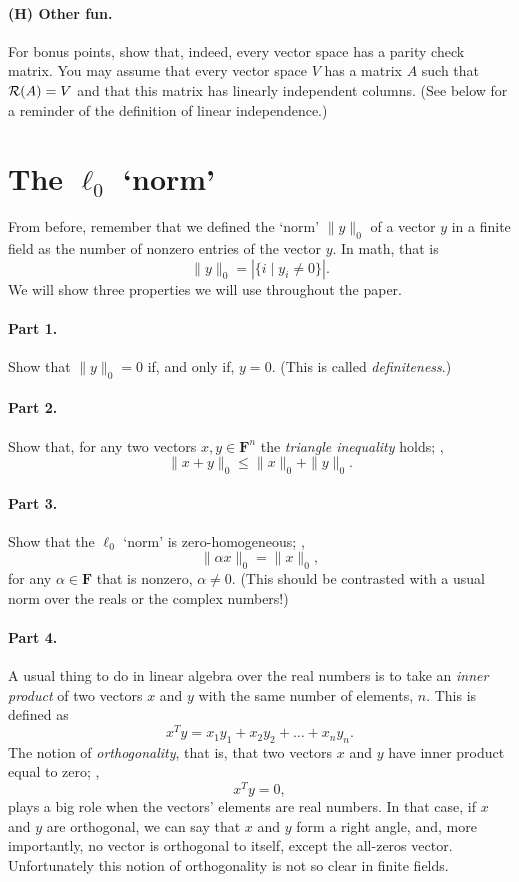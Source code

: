 \documentclass[12pt]{article}
\newcommand{\field}{\mathbf{F}}
\begin{document}
\paragraph{(H) Other fun.} For bonus points, show that, indeed, every vector space
has a parity check matrix. You may assume that every vector space $V$ has a
matrix $A$ such that ${\mathcal R}(A) = V$ and that this matrix has linearly
independent columns. (See below for a reminder of the definition of linear
independence.)

\section{The $\ell_0$ `norm'}
From before, remember that we defined the `norm' $\|y\|_0$ of a vector $y$ in a
finite field as the number of nonzero entries of the vector $y$. In math,
that is
\[
    \|y\|_0 = |\{i\mid y_i \ne 0\}|.
\]
We will show three properties we will use throughout the paper.

\paragraph{Part 1.} Show that $\|y\|_0 = 0$ if, and only if, $y = 0$. (This
is called \emph{definiteness}.)

\paragraph{Part 2.} Show that, for any two vectors $x, y \in \field^n$
the \emph{triangle inequality} holds; \ie,
\[
    \|x + y\|_0 \le \|x\|_0 + \|y\|_0.
\]

\paragraph{Part 3.} Show that the $\ell_0$ `norm' is zero-homogeneous; \ie,
\[
    \|\alpha x\|_0 = \|x\|_0,
\]
for any $\alpha \in \field$ that is nonzero, $\alpha \ne 0$. (This should be
contrasted with a usual norm over the reals or the complex numbers!)

\paragraph{Part 4.} A usual thing to do in linear algebra over the real
numbers is to take an \emph{inner product} of two vectors $x$ and $y$ with
the same number of elements, $n$. This is defined as
\[
    x^Ty = x_1y_1 + x_2y_2 + \dots + x_ny_n.
\]
The notion of \emph{orthogonality}, that is, that two vectors $x$ and $y$ have
inner product equal to zero; \ie,
\[
    x^Ty = 0,
\]
plays a big role when the vectors' elements are real numbers. In that case, if
$x$ and $y$ are orthogonal, we can say that $x$ and $y$ form a right angle,
and, more importantly, no vector is orthogonal to itself, except the all-zeros
vector. Unfortunately this notion of orthogonality is not so clear in finite
fields.
\end{document}
